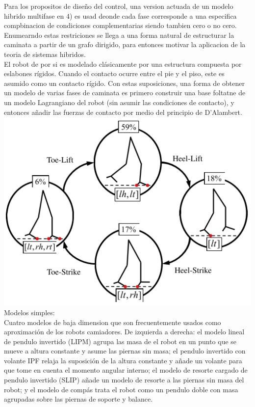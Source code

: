 \documentclass[10pt,onecolumn,twoside,letterpaper]{article}
\begin{document}
Para los propositos de dise\~no del control, una version actuada de un modelo hibrido multifase en 4) es usad deonde cada fase corresponde a una especifica compbinacion de condiciones complementarias siendo tambien cero o no cero. Enumearndo estas restriciones se llega a una forma natural de estructurar la caminata a partir de un grafo dirigido, para entonces motivar la aplicacion de la teoria de sistemas hibridos\cite{Grizzle2014}.\\
El robot de por si es modelado cl\'asicamente por una estructura compuesta por eslabones r\'igidos. Cuando el contacto ocurre entre el pie y el piso, este es asumido como un contacto r\'igido. Con estas suposiciones, una forma de obtener un modelo de varias fases de caminata es primero construir una base foltatne de un modelo Lagrangiano del robot (sin asumir las condiciones de contacto), y entonces a\~nadir las fuerzas de contacto por medio del principio de D'Alambert.\cite{Grizzle2014}\\
\includegraphics[scale=0.4]{../../images/DirectedGraphBipedModel.png}\cite{Grizzle2014}\\
Modelos simples:\\
Cuatro modelos de baja dimension que son frecuentemente usados como aproximaci\'on de los robots camiadores. De izquierda a derecha: el modelo lineal de pendulo invertido (LIPM) agrupa las masa de el robot en un punto que se mueve a altura constante y asume las piernas sin masa; el pendulo invertido con volante IPF relaja la suposici\'on de la altura constante y a\~nade un volante para que tome en cuenta el momento angular interno; el modelo de resorte cargado de pendulo invertido (SLIP) a\~nade un modelo de resorte a las piernas sin masa del robot; y el modelo de comp\'as trata el robot como un pendulo doble con masa agrupadas sobre las piernas de soporte y balance.\cite{Grizzle2014}\\
\end{document}
